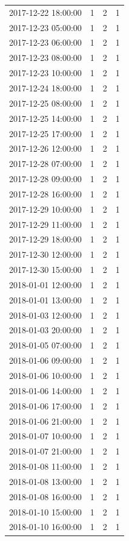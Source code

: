 \begin{tabular}{lrrr}
2017-12-22 18:00:00 & 1 & 2 & 1 \\
2017-12-23 05:00:00 & 1 & 2 & 1 \\
2017-12-23 06:00:00 & 1 & 2 & 1 \\
2017-12-23 08:00:00 & 1 & 2 & 1 \\
2017-12-23 10:00:00 & 1 & 2 & 1 \\
2017-12-24 18:00:00 & 1 & 2 & 1 \\
2017-12-25 08:00:00 & 1 & 2 & 1 \\
2017-12-25 14:00:00 & 1 & 2 & 1 \\
2017-12-25 17:00:00 & 1 & 2 & 1 \\
2017-12-26 12:00:00 & 1 & 2 & 1 \\
2017-12-28 07:00:00 & 1 & 2 & 1 \\
2017-12-28 09:00:00 & 1 & 2 & 1 \\
2017-12-28 16:00:00 & 1 & 2 & 1 \\
2017-12-29 10:00:00 & 1 & 2 & 1 \\
2017-12-29 11:00:00 & 1 & 2 & 1 \\
2017-12-29 18:00:00 & 1 & 2 & 1 \\
2017-12-30 12:00:00 & 1 & 2 & 1 \\
2017-12-30 15:00:00 & 1 & 2 & 1 \\
2018-01-01 12:00:00 & 1 & 2 & 1 \\
2018-01-01 13:00:00 & 1 & 2 & 1 \\
2018-01-03 12:00:00 & 1 & 2 & 1 \\
2018-01-03 20:00:00 & 1 & 2 & 1 \\
2018-01-05 07:00:00 & 1 & 2 & 1 \\
2018-01-06 09:00:00 & 1 & 2 & 1 \\
2018-01-06 10:00:00 & 1 & 2 & 1 \\
2018-01-06 14:00:00 & 1 & 2 & 1 \\
2018-01-06 17:00:00 & 1 & 2 & 1 \\
2018-01-06 21:00:00 & 1 & 2 & 1 \\
2018-01-07 10:00:00 & 1 & 2 & 1 \\
2018-01-07 21:00:00 & 1 & 2 & 1 \\
2018-01-08 11:00:00 & 1 & 2 & 1 \\
2018-01-08 13:00:00 & 1 & 2 & 1 \\
2018-01-08 16:00:00 & 1 & 2 & 1 \\
2018-01-10 15:00:00 & 1 & 2 & 1 \\
2018-01-10 16:00:00 & 1 & 2 & 1 \\

\end{tabular}
